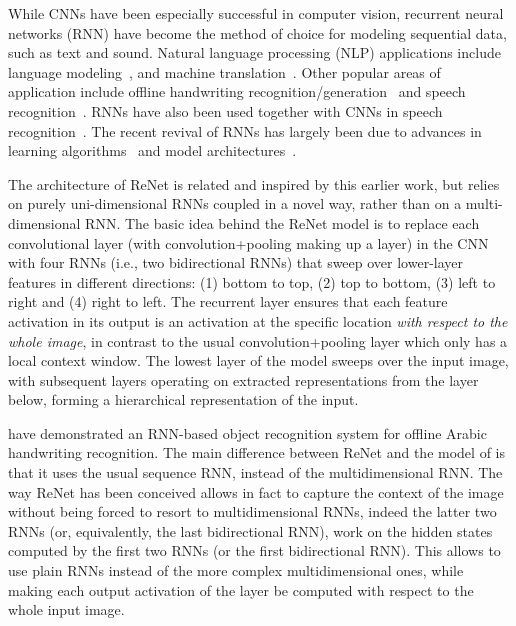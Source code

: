While CNNs have been especially successful in computer vision, recurrent
neural networks (RNN) have become the method of choice for modeling sequential
data, such as text and sound. Natural language processing (NLP) applications
include language modeling~\citep[see, e.g.,][]{Mikolov-thesis-2012}, and
machine translation~\citep{Sutskever-et-al-NIPS2014,Cho2014,
bahdanau2014neural}. Other popular areas of application include offline
handwriting recognition/generation~\citep{Graves+Schmidhuber-2009,
Graves-et-al-NIPS2007,Graves-arxiv2013} and speech recognition~\citep{
Chorowski-et-al-arxiv2014,Graves+Jaitly-ICML2014}. RNNs have also been used
together with CNNs in speech recognition~\citep{sainath2015}. The recent
revival of RNNs has largely been due to advances in learning
algorithms~\citep{Pascanu+al-ICML2013-small,Martens+Sutskever-ICML2011} and
model architectures~\citep{Pascanu-et-al-ICLR2014,Cho2014}.

The architecture of ReNet is related and inspired by this earlier work, but
relies on purely uni-dimensional RNNs coupled in a novel way, rather than on a
multi-dimensional RNN. The basic idea behind the ReNet model is to replace each
convolutional layer (with convolution+pooling making up a layer) in the CNN
with four RNNs (i.e., two bidirectional RNNs) that sweep over lower-layer
features in different directions: (1) bottom to top, (2) top to bottom, (3)
left to right and (4) right to left.  The recurrent layer ensures that each
feature activation in its output is an activation at the specific location
\emph{with respect to the whole image}, in contrast to the usual
convolution+pooling layer which only has a local context window. The lowest
layer of the model sweeps over the input image, with subsequent layers
operating on extracted representations from the layer below, forming a
hierarchical representation of the input.

\citet{Graves+Schmidhuber-2009} have demonstrated an RNN-based object
recognition system for offline Arabic handwriting recognition. The main
difference between ReNet and the model of \citet{Graves+Schmidhuber-2009} is
that it uses the usual sequence RNN, instead of the multidimensional RNN. The
way ReNet has been conceived allows in fact to capture the context of the
image without being forced to resort to multidimensional RNNs, indeed the
latter two RNNs (or, equivalently, the last bidirectional RNN), work on the
hidden states computed by the first two RNNs (or the first bidirectional RNN).
This allows to use plain RNNs instead of the more complex multidimensional
ones, while making each output activation of the layer be computed with respect
to the whole input image.

